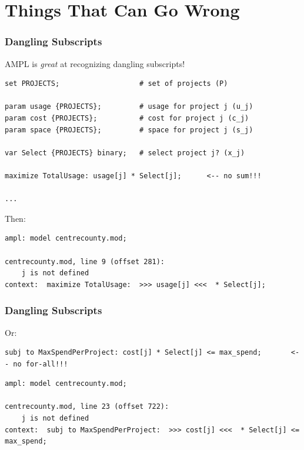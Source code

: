 \section{Things That Can Go Wrong}

\begin{frame}[fragile]

	\frametitle{Dangling Subscripts}
	
	\bit
	\item AMPL is {\em great} at recognizing dangling subscripts!
	\eit
	
\begin{lstlisting}
set PROJECTS;					# set of projects (P)

param usage {PROJECTS};			# usage for project j (u_j)
param cost {PROJECTS};			# cost for project j (c_j)
param space {PROJECTS};			# space for project j (s_j)

var Select {PROJECTS} binary; 	# select project j? (x_j)

maximize TotalUsage: usage[j] * Select[j];		<-- no sum!!!
	
...
\end{lstlisting}

	\bit
	\item Then:
	\eit

\begin{lstlisting}
ampl: model centrecounty.mod;

centrecounty.mod, line 9 (offset 281):
	j is not defined
context:  maximize TotalUsage:  >>> usage[j] <<<  * Select[j];
\end{lstlisting}

\end{frame}

\begin{frame}[fragile]

	\frametitle{Dangling Subscripts}
	
	\bit
	\item Or:
	\eit
	
\begin{lstlisting}
subj to MaxSpendPerProject: cost[j] * Select[j] <= max_spend;		<-- no for-all!!!
\end{lstlisting}


\begin{lstlisting}
ampl: model centrecounty.mod;

centrecounty.mod, line 23 (offset 722):
	j is not defined
context:  subj to MaxSpendPerProject:  >>> cost[j] <<<  * Select[j] <= max_spend;
\end{lstlisting}

\end{frame}


